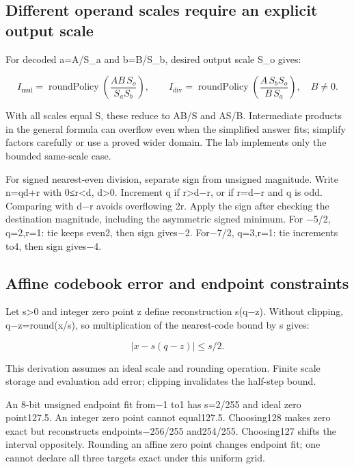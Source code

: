 \subsection{Different operand scales require an explicit output scale}\label{03-visual-computing-i-ch018-different-operand-scales-require-an-explicit-output-scale}

For decoded a=A/S\_a and b=B/S\_b, desired output scale S\_o gives:

\[
I_{\mathrm{mul}}=\operatorname{roundPolicy}
  \left(\frac{AB\,S_o}{S_aS_b}\right),
\qquad
I_{\mathrm{div}}=\operatorname{roundPolicy}
  \left(\frac{A\,S_bS_o}{B\,S_a}\right),\quad B\ne0.
\]

With all scales equal S, these reduce to AB/S and AS/B. Intermediate products in the general formula can overflow even when the simplified answer fits; simplify factors carefully or use a proved wider domain. The lab implements only the bounded same-scale case.

For signed nearest-even division, separate sign from unsigned magnitude. Write n=qd+r with 0≤r\textless d, d\textgreater0. Increment q if r\textgreater d−r, or if r=d−r and q is odd. Comparing with d−r avoids overflowing 2r. Apply the sign after checking the destination magnitude, including the asymmetric signed minimum. For −5/2, q=2,r=1: tie keeps even2, then sign gives−2. For−7/2, q=3,r=1: tie increments to4, then sign gives−4.

\subsection{Affine codebook error and endpoint constraints}\label{03-visual-computing-i-ch018-affine-codebook-error-and-endpoint-constraints}

Let s\textgreater0 and integer zero point z define reconstruction s(q−z). Without clipping, q−z=round(x/s), so multiplication of the nearest-code bound by s gives:

\[
\left|x-s(q-z)\right|\le s/2.
\]

This derivation assumes an ideal scale and rounding operation. Finite scale storage and evaluation add error; clipping invalidates the half-step bound.

An 8-bit unsigned endpoint fit from−1 to1 has s=2/255 and ideal zero point127.5. An integer zero point cannot equal127.5. Choosing128 makes zero exact but reconstructs endpoints−256/255 and254/255. Choosing127 shifts the interval oppositely. Rounding an affine zero point changes endpoint fit; one cannot declare all three targets exact under this uniform grid.

